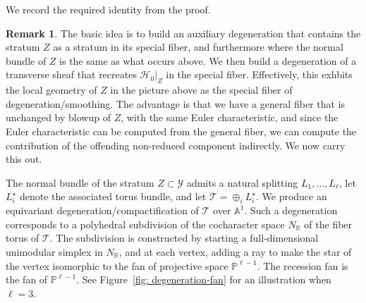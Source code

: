 \documentclass[11pt]{amsart}
\theoremstyle{definition}
\theoremstyle{definition}
\newtheorem{remark}[theorem]{Remark}
\newcommand{\RR}{\mathbb{R}}
\begin{document}
We record the required identity from the proof. 

\begin{remark}\label{rem: absurdity argument} The basic idea is to build an auxiliary degeneration that contains the stratum $Z$ as a stratum in its special fiber, and furthermore where the normal bundle of $Z$ is the same as what occurs above. We then build a degeneration of a transverse sheaf that recreates $\mathcal H_0|_{Z}$ in the special fiber. Effectively, this exhbits the local geometry of $Z$ in the picture above as the special fiber of degeneration/smoothing. The advantage is that we have a general fiber that is unchanged by blowup of $Z$, with the same Euler characteristic, and since the Euler characteristic can be computed from the general fiber, we can compute the contribution of the offending non-reduced component indirectly. We now carry this out. 


The normal bundle of the stratum $Z\subset \mathcal Y$ admits a natural splitting $L_1,\ldots,L_\ell$, let $L_i^\star$ denote the associated torus bundle, and let $\mathcal T = \oplus_i L_i^\star$. We produce an equivariant degeneration/compactification of $\mathcal T$ over $\mathbb A^1$. Such a degeneration corresponds to a polyhedral subdivision of the cocharacter space $N_\RR$ of the fiber torus of $\mathcal T$. The subdivision is constructed by starting a full-dimensional unimodular simplex in $N_\RR$, and at each vertex, adding a ray to make the star of the vertex isomorphic to the fan of projective space $\mathbb P^{\ell-1}$. The recession fan is the fan of $\mathbb P^{\ell-1}$. See Figure~\ref{fig: degeneration-fan} for an illustration when $\ell = 3$.
\begin{figure}[h!]




\begin{tikzpicture}[x=0.75pt,y=0.75pt,yscale=-1,xscale=1]


\end{tikzpicture}
\end{figure}
\end{remark}
\end{document}
